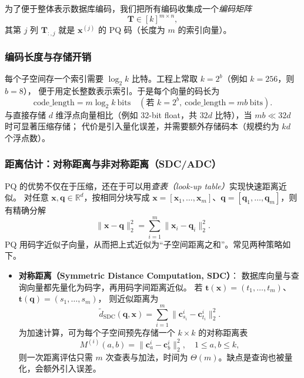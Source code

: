 \documentclass[lang=cn,newtx,10pt,scheme=chinese,chinesefont=nofont,citestyle=gb7714-2015, bibstyle=gb7714-2015]{elegantbook}
\begin{document}
\begin{refsection}
为了便于整体表示数据库编码，我们把所有编码收集成一个\emph{编码矩阵}
\[
\mathbf{T}\in [k]^{m\times n},
\]
其第 $j$ 列 $\mathbf{T}_{:,j}$ 就是 $\mathbf{x}^{(j)}$ 的 PQ 码（长度为 $m$ 的索引向量）。

\subsubsection{编码长度与存储开销}
每个子空间存一个索引需要 $\log_2 k$ 比特。工程上常取 $k=2^b$（例如 $k=256$，则 $b=8$），
便于用定长整数表示索引。于是每个向量的码长为
\begin{equation}
\mathrm{code\_length} = m\log_2 k\ \text{bits}
\quad(\text{若 } k=2^b,\ \mathrm{code\_length}=mb\ \text{bits}).
\end{equation}
与直接存储 $d$ 维浮点向量相比（例如 32-bit float，共 $32d$ 比特），当 $mb \ll 32d$ 时可显著压缩存储；
代价是引入量化误差，并需要额外存储码本（规模约为 $kd$ 个浮点数）。

\subsubsection{距离估计：对称距离与非对称距离（SDC/ADC）}
PQ 的优势不仅在于压缩，还在于可以用\emph{查表（look-up table）}实现快速距离近似。
对任意 $\mathbf{x},\mathbf{q}\in\mathbb{R}^d$，按相同分块写成
$\mathbf{x}=[\mathbf{x}_1,\ldots,\mathbf{x}_m]$、$\mathbf{q}=[\mathbf{q}_1,\ldots,\mathbf{q}_m]$，则有精确分解
\begin{equation}
\|\mathbf{x}-\mathbf{q}\|_2^2=\sum_{i=1}^m \|\mathbf{x}_i-\mathbf{q}_i\|_2^2.
\end{equation}
PQ 用码字近似子向量，从而把上式近似为“子空间距离之和”。常见两种策略如下。

\begin{itemize}
\item \textbf{对称距离（Symmetric Distance Computation, SDC）}：
数据库向量与查询向量都先量化为码字，再用码字间距离近似。
若 $\mathbf{t}(\mathbf{x})=(t_1,\ldots,t_m)$、$\mathbf{t}(\mathbf{q})=(s_1,\ldots,s_m)$，
则近似距离为
\begin{equation}
\widetilde{d}_{\mathrm{SDC}}(\mathbf{q},\mathbf{x})
=\sum_{i=1}^m \|\mathbf{c}_{s_i}^i-\mathbf{c}_{t_i}^i\|_2^2.
\end{equation}
为加速计算，可为每个子空间预先存储一个 $k\times k$ 的对称距离表
\[
M^{(i)}(a,b)=\|\mathbf{c}_a^i-\mathbf{c}_b^i\|_2^2,\quad 1\le a,b\le k,
\]
则一次距离评估只需 $m$ 次查表与加法，时间为 $\Theta(m)$。缺点是查询也被量化，会额外引入误差。


\end{itemize}
\end{refsection}
\end{document}
